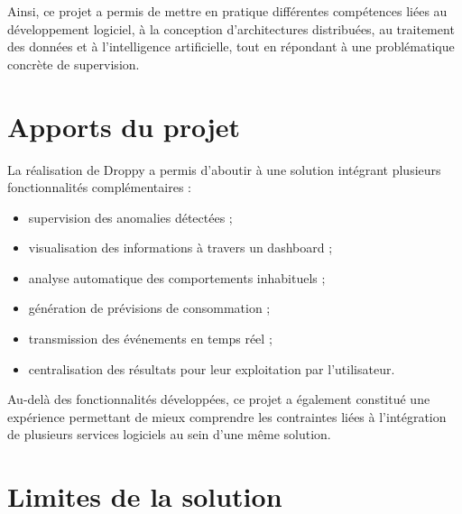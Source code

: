Ainsi, ce projet a permis de mettre en pratique différentes compétences
liées au développement logiciel, à la conception d'architectures
distribuées, au traitement des données et à l'intelligence artificielle,
tout en répondant à une problématique concrète de supervision.



\section{Apports du projet}

La réalisation de Droppy a permis d'aboutir à une solution intégrant
plusieurs fonctionnalités complémentaires :

\begin{itemize}

    \item supervision des anomalies détectées ;

    \item visualisation des informations à travers un dashboard ;

    \item analyse automatique des comportements inhabituels ;

    \item génération de prévisions de consommation ;

    \item transmission des événements en temps réel ;

    \item centralisation des résultats pour leur exploitation par
    l'utilisateur.

\end{itemize}

Au-delà des fonctionnalités développées, ce projet a également constitué une
expérience permettant de mieux comprendre les contraintes liées à
l'intégration de plusieurs services logiciels au sein d'une même solution.



\section{Limites de la solution}

